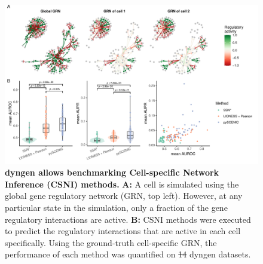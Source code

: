 \documentclass[
  table,
  10pt,
  a4paper]{article}
\providecommand{\DIFaddtex}[1]{{\protect\color{blue}\uwave{#1}}} %
\providecommand{\DIFdeltex}[1]{{\protect\color{red}\sout{#1}}}                      %
\providecommand{\DIFaddFL}[1]{\DIFadd{#1}} %
\providecommand{\DIFdelFL}[1]{\DIFdel{#1}} %
\providecommand{\DIFaddbeginFL}{} %
\providecommand{\DIFaddendFL}{} %
\providecommand{\DIFdelbeginFL}{} %
\providecommand{\DIFdelendFL}{} %
\providecommand{\DIFadd}[1]{\texorpdfstring{\DIFaddtex{#1}}{#1}} %
\providecommand{\DIFdel}[1]{\texorpdfstring{\DIFdeltex{#1}}{}} %
\newcommand{\DIFscaledelfig}{0.5}
\newlength{\DIFdelgraphicswidth} %
\newlength{\DIFdelgraphicsheight} %
\newcommand{\DIFaddincludegraphics}[2][]{{\color{blue}\fbox{\DIFOincludegraphics[#1]{#2}}}} %
\newcommand{\DIFdelincludegraphics}[2][]{%
\sbox{\DIFdelgraphicsbox}{\DIFOincludegraphics[#1]{#2}}%
\settoboxwidth{\DIFdelgraphicswidth}{\DIFdelgraphicsbox} %
\settoboxtotalheight{\DIFdelgraphicsheight}{\DIFdelgraphicsbox} %
\scalebox{\DIFscaledelfig}{%
\parbox[b]{\DIFdelgraphicswidth}{\usebox{\DIFdelgraphicsbox}\\[-\baselineskip] \rule{\DIFdelgraphicswidth}{0em}}\llap{\resizebox{\DIFdelgraphicswidth}{\DIFdelgraphicsheight}{%
\setlength{\unitlength}{\DIFdelgraphicswidth}%
\begin{picture}(1,1)%
\thicklines\linethickness{2pt} %
{\color[rgb]{1,0,0}\put(0,0){\framebox(1,1){}}}%
{\color[rgb]{1,0,0}\put(0,0){\line( 1,1){1}}}%
{\color[rgb]{1,0,0}\put(0,1){\line(1,-1){1}}}%
\end{picture}%
}\hspace*{3pt}}} %
} %
\DeclareRobustCommand{\DIFaddbeginFL}{\DIFOaddbeginFL \let\includegraphics\DIFaddincludegraphics} %
\DeclareRobustCommand{\DIFaddendFL}{\DIFOaddendFL \let\includegraphics\DIFOincludegraphics} %
\DeclareRobustCommand{\DIFdelbeginFL}{\DIFOdelbeginFL \let\includegraphics\DIFdelincludegraphics} %
\DeclareRobustCommand{\DIFdelendFL}{\DIFOaddendFL \let\includegraphics\DIFOincludegraphics} %
\begin{document}
\begin{figure}[H]
    \centering
    \DIFdelbeginFL %
\DIFdelendFL \DIFaddbeginFL \includegraphics[width=\linewidth]{result_files/usecase_network_inference/supp_fig.pdf}
    \DIFaddendFL \caption{
            \textbf{dyngen allows benchmarking Cell-specific Network Inference (CSNI) methods.} 
            \textbf{A:} A cell is simulated using the global gene regulatory network (GRN, top left). However, at any particular state in the simulation, only a fraction of the gene regulatory interactions are active.
            \textbf{B:} CSNI methods were executed to predict the regulatory interactions that are active in each cell specifically. Using the ground-truth cell-specific GRN, the performance of each method was quantified on \DIFdelbeginFL \DIFdelFL{14 }\DIFdelendFL \DIFaddbeginFL \DIFaddFL{42 }\DIFaddendFL dyngen datasets. 
    }
    \label{fig:scgrn}
\end{figure}
\end{document}
